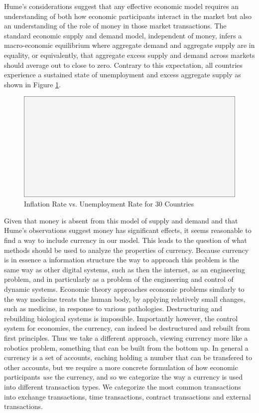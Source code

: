 Hume's considerations suggest that any effective economic model requires an understanding of both
how economic participants interact in the market but also an understanding of the role of money in
those market transactions. The standard economic supply and demand model, independent of money, infers
a macro-economic equilibrium where aggregate demand and aggregate supply are in equality, or
equivalently, that aggregate excess supply and demand across markets should average out to close to
zero. Contrary to this expectation, all countries experience a sustained state of unemployment and
excess aggregate supply as shown in Figure \ref{fig:ui_all_data}.

\begin{figure}[H]
\centering
\includegraphics[scale=0.48]{blank}
\caption{Inflation Rate vs. Unemployment Rate for 30 Countries}
\label{fig:ui_all_data}
\end{figure}

Given that money is absent from this model of supply and demand and that Hume's observations suggest
money has significant effects, it seems reasonable to find a way to include currency in our model.
This leads to the question of what methods should be used to analyze the properties of currency.
Because currency is in essence a information structure the way to approach this problem is the same
way as other digital systems, such as then the internet, as an engineering problem, and in
particularly as a problem of the engineering and control of dynamic systems. Economic theory
approaches economic problems similarly to the way medicine treats the human body, by applying
relatively small changes, such as medicine, in response to various pathologies. Destructuring and
rebuilding biological systems is impossible. Importantly however, the control system for economies,
the currency, can indeed be destructured and rebuilt from first principles. Thus we take a different
approach, viewing currency more like a robotics problem, something that can be built from
the bottom up. In general a currency is a set of accounts, eaching holding a number that can be
transfered to other accounts, but we require a more concrete formulation of how economic
participants \textit{use} the currency, and so we categorize the way a currency is used into
different transaction types. We categorize the most common transactions into exchange transactions,
time transactions, contract transactions and external transactions.

